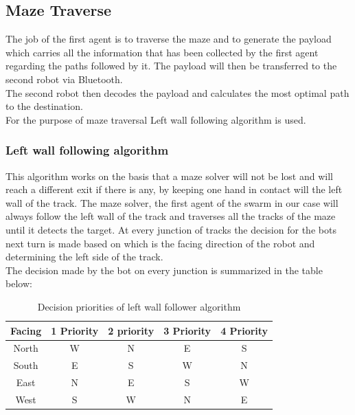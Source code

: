 \newpage
\subsection{Maze Traverse}
The job of the first agent is to traverse the maze and to generate the payload which carries all the information that has been collected by the first agent regarding the paths followed by it. The payload will then be transferred to the second robot via Bluetooth.\\
The second robot then decodes the payload and calculates the most optimal path to the destination.\\
For the purpose of maze traversal Left wall following algorithm is used.
\subsubsection{Left wall following algorithm}
This algorithm works on the basis that a maze solver will not be lost and will reach a different exit if there is any, by keeping one hand in contact will the left wall of the track. The maze solver, the first agent of the swarm in our case will always follow the left wall of the track and traverses all the tracks of the maze until it detects the target. At every junction of tracks the decision for the bots next turn is made based on which is the facing direction of the robot and determining the left side of the track. \\
The decision made by the bot on every junction is summarized in the table below:
\begin{table}[h]
\begin{center}
\begin{tabular}{ |c|c|c|c|c| } 
 \hline
 Facing & 	1 Priority & 2 priority &3 Priority&4 Priority\\ 
 \hline
 North& W &N  &E&S  \\ 
 \hline
 South & E &  S&W&N \\ 
\hline
 East&  N  & E &S & W \\
\hline
 West&S&W&N&E  \\
\hline
\end{tabular}
\caption{Decision priorities of left wall follower algorithm}
\end{center}
\end{table}
